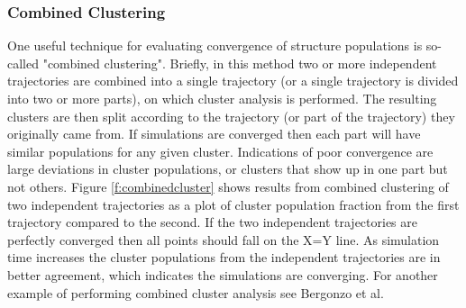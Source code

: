 \subsubsection*{Combined Clustering}
One useful technique for evaluating convergence of structure populations is so-called "combined clustering". Briefly, in this method two or more independent trajectories are combined into a single trajectory (or a single trajectory is divided into two or more parts), on which cluster analysis is performed. The resulting clusters are then split according to the trajectory (or part of the trajectory) they originally came from. If simulations are converged then each part will have similar populations for any given cluster. Indications of poor convergence are large deviations in cluster populations, or clusters that show up in one part but not others. Figure \ref{f:combinedcluster} shows results from combined clustering of two independent trajectories as a plot of cluster population fraction from the first trajectory compared to the second. If the two independent trajectories are perfectly converged then all points should fall on the X=Y line. As simulation time increases the cluster populations from the independent trajectories are in better agreement, which indicates the simulations are converging. For another example of performing combined cluster analysis see Bergonzo et al.\citep{Bergonzo2014}
